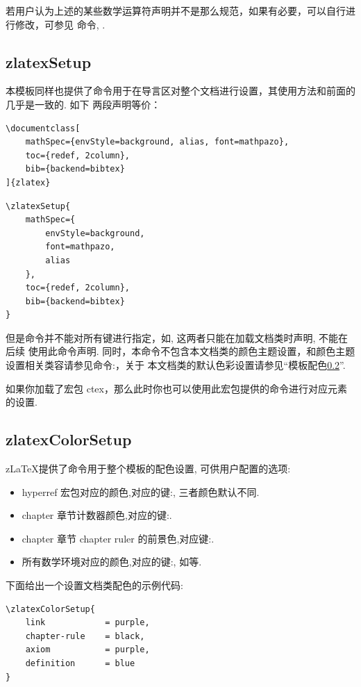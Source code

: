 若用户认为上述的某些数学运算符声明并不是那么规范，如果有必要，可以自行进行修改，可参见
命令\cmd{\DeclareMathOperator}, \cmd{\DeclareMathAlphabet}.

\subsection{zlatexSetup}
本模板同样也提供了命令\cmd{\zlatexSetup}用于在导言区对整个文档进行设置，其使用方法和前面的几乎是一致的. 如下
两段声明等价：
\begin{verbatim}
\documentclass[
    mathSpec={envStyle=background, alias, font=mathpazo},
    toc={redef, 2column},
    bib={backend=bibtex}
]{zlatex}
\end{verbatim}

\begin{verbatim}
\zlatexSetup{
    mathSpec={
        envStyle=background,
        font=mathpazo, 
        alias
    },
    toc={redef, 2column},
    bib={backend=bibtex}
}
\end{verbatim}

但是命令\cmd{\zlatexSetup}并不能对所有键进行指定，如,  这两者只能在加载文档类时声明, 不能在后续
使用此命令声明. 同时，本命令不包含本文档类的颜色主题设置，和颜色主题设置相关类容请参见命令:\cmd{\zlatexColorSetup}，关于
本文档类的默认色彩设置请参见``模板配色\cref{模板配色}''. 

如果你加载了宏包 {ctex}，那么此时你也可以使用此宏包提供的命令\cmd{\ctexset}进行对应元素的设置.

\subsection{zlatexColorSetup}\label{模板配色}
z\LaTeX{}提供了命令\cmd{\zlatexColorSetup}\index{\cmd{\zlatexColorSetup}}用于整个模板的配色设置,
可供用户配置的选项:
\begin{itemize}
    \item hyperref 宏包对应的颜色,对应的键:, 三者颜色默认不同.
    \item chapter 章节计数器颜色,对应的键:.
    \item chapter 章节 chapter ruler 的前景色,对应键:.
    \item 所有数学环境对应的颜色,对应的键:, 如等.
\end{itemize}

下面给出一个设置文档类配色的示例代码:
\begin{verbatim}
\zlatexColorSetup{
    link            = purple,
    chapter-rule    = black,
    axiom           = purple,
    definition      = blue
}
\end{verbatim}

